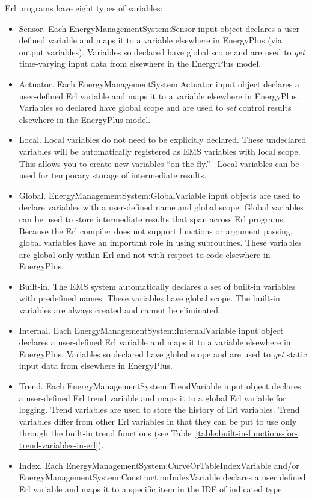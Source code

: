 Erl programs have eight types of variables:

\begin{itemize}
\item
  Sensor. Each EnergyManagementSystem:Sensor input object declares a user-defined variable and maps it to a variable elsewhere in EnergyPlus (via output variables). Variables so declared have global scope and are used to \emph{get} time-varying input data from elsewhere in the EnergyPlus model.
\item
  Actuator. Each EnergyManagementSystem:Actuator input object declares a user-defined Erl variable and maps it to a variable elsewhere in EnergyPlus. Variables so declared have global scope and are used to \emph{set} control results elsewhere in the EnergyPlus model.
\item
  Local. Local variables do not need to be explicitly declared. These undeclared variables will be automatically registered as EMS variables with local scope. This allows you to create new variables ``on the fly.''~ Local variables can be used for temporary storage of intermediate results.
\item
  Global. EnergyManagementSystem:GlobalVariable input objects are used to declare variables with a user-defined name and global scope. Global variables can be used to store intermediate results that span across Erl programs. Because the Erl compiler does not support functions or argument passing, global variables have an important role in using subroutines. These variables are global only within Erl and not with respect to code elsewhere in EnergyPlus.
\item
  Built-in. The EMS system automatically declares a set of built-in variables with predefined names. These variables have global scope. The built-in variables are always created and cannot be eliminated.
\item
  Internal. Each EnergyManagementSystem:InternalVariable input object declares a user-defined Erl variable and maps it to a variable elsewhere in EnergyPlus. Variables so declared have global scope and are used to \emph{get} static input data from elsewhere in EnergyPlus.
\item
  Trend. Each EnergyManagementSystem:TrendVariable input object declares a user-defined Erl trend variable and maps it to a global Erl variable for logging. Trend variables are used to store the history of Erl variables. Trend variables differ from other Erl variables in that they can be put to use only through the built-in trend functions (see Table~\ref{table:built-in-functions-for-trend-variables-in-erl}).
\item
  Index. Each EnergyManagementSystem:CurveOrTableIndexVariable and/or EnergyManagementSystem:ConstructionIndexVariable declares a user defined Erl variable and maps it to a specific item in the IDF of indicated type.
\end{itemize}

